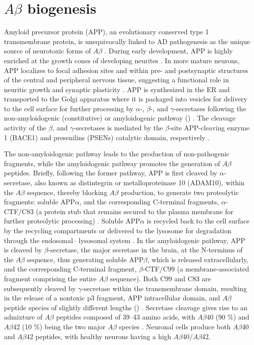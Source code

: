 \section{$A\beta$ biogenesis}
Amyloid precursor protein (APP), an evolutionary conserved type 1 transmembrane protein, is unequivocally linked to AD pathogenesis as the unique source of neurotoxic forms of $A\beta$ \citep{Chen2015,Rajendran2012}. During early development, APP is highly enriched at the growth cones of developing neurites \citep{Ramaker2016,Sabo2003}. In more mature neurons, APP localizes to focal adhesion sites and within pre- and postsynaptic structures of the central and peripheral nervous tissue, suggesting a functional role in neuritic growth and synaptic plasticity \citep{Ashley2005,Yamazaki1997}. APP is synthesized in the ER and transported to the Golgi apparatus where it is packaged into vesicles for delivery to the cell surface for further processing by $\alpha$-, $\beta$-, and $\gamma$-secretases following the non-amyloidogenic (constitutive) or amyloidogenic pathway () \citep{Obrien2011,Ramaker2016}. The cleavage activity of the $\beta$, and $\gamma$-secretases is mediated by the  $\beta$-site APP-cleaving enzyme 1 (BACE1) and presenilins (PSENs) catalytic domain, respectively \citep{Rajendran2012}. 

The non-amyloidogenic pathway leads to the production of non-pathogenic fragments, while the amyloidogenic pathway promotes the generation of $A\beta$ peptides. Briefly, following the former pathway, APP is first cleaved by $\alpha$-secretase, also known as distintegrin or metalloproteinase 10 (ADAM10), within the $A\beta$ sequence, thereby blocking $A\beta$ production, to generate two proteolytic fragments: soluble APP$\alpha$, and the corresponding C-terminal fragments, $\alpha$-CTF/C83 (a protein stub that remains secured to the plasma membrane for further proteolytic processing) \citep{Gandy1994,Roychaudhuri2009}. Soluble APP$\alpha$ is recycled back to the cell surface by the recycling compartments or delivered to the lysosome for degradation through the endosomal– lysosomal system \citep{Caster2013,Golde1992}. In the amyloidogenic pathway, APP is cleaved by $\beta$-secretase, the major secretase in the brain, at the N-terminus of the $A\beta$ sequence, thus generating soluble APP$\beta$, which is released extracellularly, and the corresponding C-terminal fragment, $\beta$-CTF/C99 (a membrane-associated fragment comprising the entire $A\beta$ sequence). Both C99 and C83 are subsequently cleaved by $\gamma$-secretase within the transmembrane domain, resulting in the release of a nontoxic p3 fragment, APP intracellular domain, and $A\beta$ peptide species of slightly different lengths () \citep{Cole2007,Jarrett1993}. Secretase cleavage gives rise to an admixture of $A\beta$ peptides composed of 39–43 amino acids, with $A\beta$40 (90 \%) and $A\beta$42 (10 \%) being the two major $A\beta$ species \citep{Gouras2000,Takahasi2013}. Neuronal cells produce both $A\beta$40 and $A\beta$42 peptides, with healthy neurons having a high $A\beta$40/$A\beta$42.

